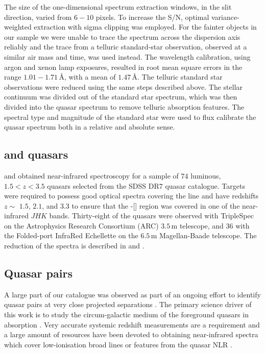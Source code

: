 The size of the one-dimensional spectrum extraction windows, in the slit direction, varied from $6-10$ pixels. 
To increase the S/N, optimal variance-weighted extraction with sigma clipping was employed. 
For the fainter objects in our sample we were unable to trace the spectrum across the dispersion axis reliably and the trace from a telluric standard-star observation, observed at a similar air mass and time, was used instead. 
The wavelength calibration, using argon and xenon lamp exposures, resulted in root mean square errors in the range $1.01-1.71$\,\AA, with a mean of $1.47$\,\AA. 
The telluric standard star observations were reduced using the same steps described above. 
The stellar continuum was divided out of the standard star spectrum, which was then divided into the quasar spectrum to remove telluric absorption features. 
The spectral type and magnitude of the standard star were used to flux calibrate the quasar spectrum both in a relative and absolute sense.

\subsection{\citet{shen12} and \citet{shen16a} quasars}

\citet{shen16a} and \citet{shen12} obtained near-infrared spectroscopy for a sample of $74$ luminous, $1.5 < z < 3.5$ quasars selected from the SDSS DR$7$ quasar catalogue. 
Targets were required to possess good optical spectra covering the  line and have redshifts $z\sim$ $1.5$, $2.1$, and $3.3$ to ensure that the \hbns-[] region was covered in one of the near-infrared $JHK$ bands.
Thirty-eight of the quasars were observed with TripleSpec \citep{wilson04} on the Astrophysics Research Consortium (ARC) $3.5$\,m telescope, and $36$ with the Folded-port InfraRed Echellette \citep[FIRE;][]{simcoe10} on the $6.5$\,m Magellan-Baade telescope.
The reduction of the spectra is described in \citet{shen16a} and \citet{shen12}. 

\subsection{Quasar pairs}

A large part of our catalogue was observed as part of an ongoing effort to identify quasar pairs at very close projected separations \citep[Quasars Probing Quasars\footnote{www.ucolick.org/\textasciitilde xavier/QPQ/Quasars\_Probing\_Quasars};][]{hennawi06a,hennawi10}. 
The primary science driver of this work is to study the circum-galactic medium of the foreground quasars in absorption \citep{hennawi06b}.
Very accurate systemic redshift measurements are a requirement and a large amount of resources have been devoted to obtaining near-infrared spectra which cover low-ionisation broad lines or features from the quasar NLR \citep{prochaska09,lau16,hennawi15}. 

